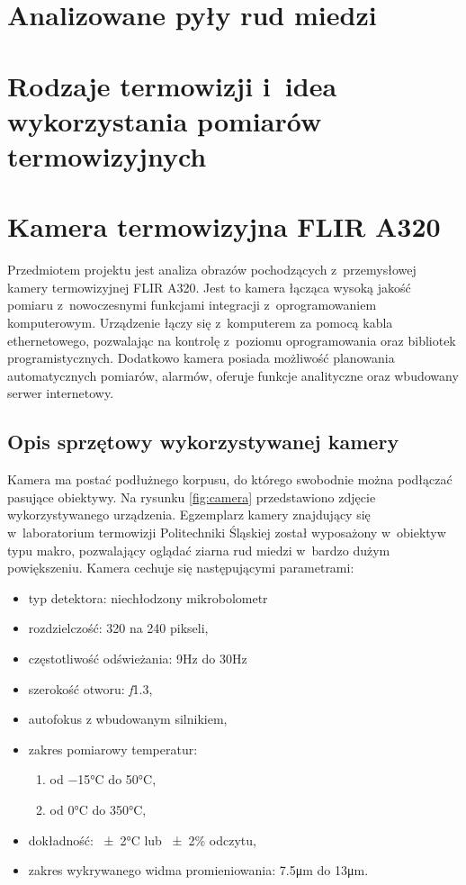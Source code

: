 \section{Analizowane pyły rud miedzi}

\section{Rodzaje termowizji i~idea wykorzystania pomiarów termowizyjnych}

\section{Kamera termowizyjna FLIR A320}
Przedmiotem projektu jest analiza obrazów pochodzących z~przemysłowej
kamery termowizyjnej FLIR A320.
Jest to kamera łącząca wysoką jakość pomiaru z~nowoczesnymi funkcjami
integracji z~oprogramowaniem komputerowym.
Urządzenie łączy się z~komputerem za pomocą kabla ethernetowego,
pozwalając na kontrolę z~poziomu oprogramowania oraz bibliotek
programistycznych.
Dodatkowo kamera posiada możliwość planowania automatycznych pomiarów,
alarmów, oferuje funkcje analityczne oraz wbudowany serwer internetowy.

\subsection{Opis sprzętowy wykorzystywanej kamery}
Kamera ma postać podłużnego korpusu, do którego swobodnie można podłączać
pasujące obiektywy.
Na rysunku \ref{fig:camera} przedstawiono zdjęcie wykorzystywanego urządzenia.
Egzemplarz kamery znajdujący się w~laboratorium termowizji Politechniki
Śląskiej został wyposażony w~obiektyw typu makro, pozwalający oglądać
ziarna rud miedzi w~bardzo dużym powiększeniu.
Kamera cechuje się następującymi parametrami:
\begin{itemize}
	\item typ detektora: niechłodzony mikrobolometr
	\item rozdzielczość: \num{320} na \num{240} pikseli,
	\item częstotliwość odświeżania: \num{9}\si{\hertz} do \num{30}\si{\hertz}
	\item szerokość otworu: \textit{f}\num{1,3},
	\item autofokus z wbudowanym silnikiem,
	\item zakres pomiarowy temperatur: 
		\begin{enumerate}
			\item od \num{-15}\si{\celsius} do \num{+50}\si{\celsius},
			\item od \num{0}\si{\celsius} do \num{350}\si{\celsius},
		\end{enumerate}
	\item dokładność: \num{\pm2}\si{\celsius} lub \num{\pm2}\% odczytu,
	\item zakres wykrywanego widma promieniowania: \num{7,5}\si{\micro\meter}
          do \num{13}\si{\micro\meter}.
\end{itemize}

